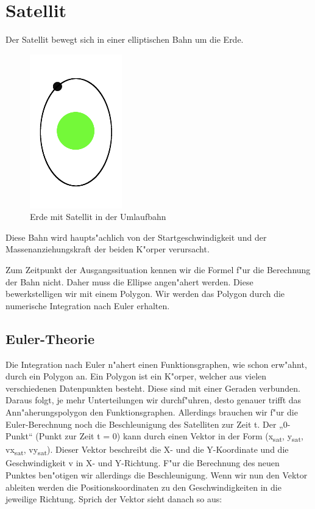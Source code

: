 \documentclass[11pt]{report}
\begin{document}
\section{Satellit}
Der Satellit bewegt sich in einer elliptischen 		Bahn um die Erde. 
\begin{figure}[h!]
\centering
\includegraphics[width=4cm]{Erde_Umlaufbahn.png}
\caption{Erde mit Satellit in der Umlaufbahn}
\label{fig1}
\end{figure}
Diese Bahn wird haupts"achlich 	von der Startgeschwindigkeit und der 	Massenanziehungskraft der beiden K"orper 	verursacht.

Zum Zeitpunkt der Ausgangssituation kennen wir 		die Formel f"ur die Berechnung der Bahn nicht. 		Daher muss die Ellipse angen"ahert werden. Diese 		bewerkstelligen wir mit einem Polygon. Wir 			werden das Polygon durch die numerische 				Integration nach Euler erhalten.
		
\subsection{Euler-Theorie}
Die Integration nach Euler n"ahert einen 			Funktionsgraphen, wie schon erw"ahnt, durch 		ein Polygon an. Ein Polygon ist ein K"orper, 			welcher aus vielen verschiedenen 					Datenpunkten besteht. Diese sind mit einer 			Geraden verbunden. Daraus folgt, je mehr 			Unterteilungen wir durchf"uhren, desto 				genauer trifft das Ann"aherungspolygon den 			Funktionsgraphen. Allerdings brauchen wir 			f"ur die Euler-Berechnung noch die 					Beschleunigung des Satelliten zur Zeit t.
Der „0-Punkt“ (Punkt zur Zeit t = 0) kann 			durch einen Vektor in der Form (x\textsubscript{sat}, y\textsubscript{sat}, vx\textsubscript{sat}, vy\textsubscript{sat}). Dieser Vektor beschreibt 		die X- und die Y-Koordinate und die 						Geschwindigkeit v in X- und Y-Richtung. F"ur 			die Berechnung des neuen Punktes ben"otigen 			wir allerdings die Beschleunigung.
Wenn wir nun den Vektor ableiten werden die 			Positionskoordinaten zu den 							Geschwindigkeiten in die jeweilige 					Richtung. Sprich der Vektor sieht danach so aus:
\newline
\end{document}
